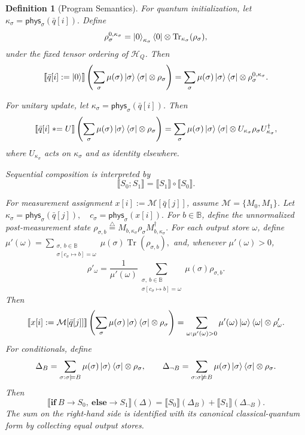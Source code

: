\documentclass[acmsmall,screen,review,anonymous,nonacm]{acmart}
\newtheorem{definition}{Definition}[section]
\theoremstyle{defn_style}
\newcommand{\asteq}{\mathrel{*}=}
\begin{document}
\begin{definition}[Program Semantics]
For quantum initialization, let
\(\kappa_\sigma=\mathsf{phys}_\sigma(\bar q[i]).\)
Define
\[
\rho_\sigma^{0,\kappa_\sigma}
=
\ket 0_{\kappa_\sigma}\bra 0
\otimes
\operatorname{Tr}_{\kappa_\sigma}(\rho_\sigma),
\]
under the fixed tensor ordering of \(\mathcal H_Q\). Then
\[
\llbracket \bar q[i]:=\ket 0\rrbracket
\left(
\sum_\sigma\mu(\sigma)\ket{\sigma}\bra{\sigma}\otimes\rho_\sigma
\right)
=
\sum_\sigma
\mu(\sigma)\ket{\sigma}\bra{\sigma}
\otimes
\rho_\sigma^{0,\kappa_\sigma}.
\]

For unitary update, let \(\kappa_\sigma=\mathsf{phys}_\sigma(\bar q[i])\).
Then
\[
\llbracket \bar q[i]\asteq U\rrbracket
\left(
\sum_\sigma\mu(\sigma)\ket{\sigma}\bra{\sigma}\otimes\rho_\sigma
\right)
=
\sum_\sigma
\mu(\sigma)\ket{\sigma}\bra{\sigma}
\otimes
U_{\kappa_\sigma}\rho_\sigma U_{\kappa_\sigma}^{\dagger},
\]
where \(U_{\kappa_\sigma}\) acts on \(\kappa_\sigma\) and as identity elsewhere.

Sequential composition is interpreted by
\[
\llbracket S_0;S_1\rrbracket
=
\llbracket S_1\rrbracket\circ\llbracket S_0\rrbracket.
\]

For measurement assignment \(x[i]:=\mathcal M[\bar q[j]]\), assume
\(\mathcal M=\{M_0,M_1\}\). Let
\(\kappa_\sigma=\mathsf{phys}_\sigma(\bar q[j]),
\quad
c_\sigma=\mathsf{phys}_\sigma(x[i]).\)
For \(b\in\mathbb B\), define the unnormalized post-measurement state
\(\rho_{\sigma,b}
\stackrel{\triangle}{=}
M_{b,\kappa_\sigma}\rho_\sigma M_{b,\kappa_\sigma}^{\dagger}.\)
For each output store \(\omega\), define
\(\mu'(\omega)
=
\sum_{\substack{\sigma,\ b\in\mathbb B\\
\sigma[c_\sigma\mapsto b]=\omega}}
\mu(\sigma)\operatorname{Tr}(\rho_{\sigma,b}),\)
and, whenever \(\mu'(\omega)>0\),
\[
\rho'_\omega
=
\frac{1}{\mu'(\omega)}
\sum_{\substack{\sigma,\ b\in\mathbb B\\
\sigma[c_\sigma\mapsto b]=\omega}}
\mu(\sigma)\rho_{\sigma,b}.
\]
Then
\[
\llbracket x[i]:=\mathcal M[\bar q[j]]\rrbracket
\left(
\sum_\sigma\mu(\sigma)\ket{\sigma}\bra{\sigma}\otimes\rho_\sigma
\right)
=
\sum_{\omega:\mu'(\omega)>0}
\mu'(\omega)\ket{\omega}\bra{\omega}\otimes\rho'_\omega .
\]
For conditionals, define
\[
\Delta_B=
\sum_{\sigma:\sigma\models B}
\mu(\sigma)\ket{\sigma}\bra{\sigma}\otimes\rho_\sigma,
\qquad
\Delta_{\neg B}=
\sum_{\sigma:\sigma\not\models B}
\mu(\sigma)\ket{\sigma}\bra{\sigma}\otimes\rho_\sigma .
\]
Then
\[
\llbracket
\mathbf{if}\ B\rightarrow S_0,\ \mathbf{else}\rightarrow S_1
\rrbracket(\Delta)
=
\llbracket S_0\rrbracket(\Delta_B)
+
\llbracket S_1\rrbracket(\Delta_{\neg B}).
\]
The sum on the right-hand side is identified with its canonical
classical-quantum form by collecting equal output stores.



\end{definition}
\end{document}
